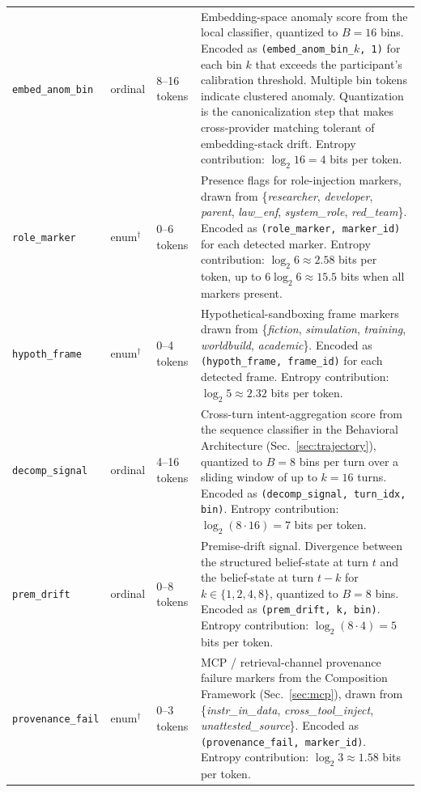 \documentclass[11pt]{article}
\begin{document}
{\begin{longtable}{@{}p{2.6cm} p{1.6cm} p{1.8cm} p{8.0cm}@{}}
\texttt{embed\_anom\_bin} & ordinal & 8--16 tokens & Embedding-space anomaly score from the local classifier, quantized to $B = 16$ bins. Encoded as \texttt{(embed\_anom\_bin\_$k$, 1)} for each bin $k$ that exceeds the participant's calibration threshold. Multiple bin tokens indicate clustered anomaly. Quantization is the canonicalization step that makes cross-provider matching tolerant of embedding-stack drift. Entropy contribution: $\log_2 16 = 4$ bits per token. \\

\texttt{role\_marker} & enum$^\dagger$ & 0--6 tokens & Presence flags for role-injection markers, drawn from \{\textit{researcher}, \textit{developer}, \textit{parent}, \textit{law\_enf}, \textit{system\_role}, \textit{red\_team}\}. Encoded as \texttt{(role\_marker, marker\_id)} for each detected marker. Entropy contribution: $\log_2 6 \approx 2.58$ bits per token, up to $6 \log_2 6 \approx 15.5$ bits when all markers present. \\

\texttt{hypoth\_frame} & enum$^\dagger$ & 0--4 tokens & Hypothetical-sandboxing frame markers drawn from \{\textit{fiction}, \textit{simulation}, \textit{training}, \textit{worldbuild}, \textit{academic}\}. Encoded as \texttt{(hypoth\_frame, frame\_id)} for each detected frame. Entropy contribution: $\log_2 5 \approx 2.32$ bits per token. \\

\texttt{decomp\_signal} & ordinal & 4--16 tokens & Cross-turn intent-aggregation score from the sequence classifier in the Behavioral Architecture (Sec.~\ref{sec:trajectory}), quantized to $B = 8$ bins per turn over a sliding window of up to $k = 16$ turns. Encoded as \texttt{(decomp\_signal, turn\_idx, bin)}. Entropy contribution: $\log_2 (8 \cdot 16) = 7$ bits per token. \\

\texttt{prem\_drift} & ordinal & 0--8 tokens & Premise-drift signal. Divergence between the structured belief-state at turn $t$ and the belief-state at turn $t - k$ for $k \in \{1, 2, 4, 8\}$, quantized to $B = 8$ bins. Encoded as \texttt{(prem\_drift, k, bin)}. Entropy contribution: $\log_2 (8 \cdot 4) = 5$ bits per token. \\

\texttt{provenance\_fail} & enum$^\dagger$ & 0--3 tokens & MCP / retrieval-channel provenance failure markers from the Composition Framework (Sec.~\ref{sec:mcp}), drawn from \{\textit{instr\_in\_data}, \textit{cross\_tool\_inject}, \textit{unattested\_source}\}. Encoded as \texttt{(provenance\_fail, marker\_id)}. Entropy contribution: $\log_2 3 \approx 1.58$ bits per token. \\


\end{longtable}}
\end{document}
